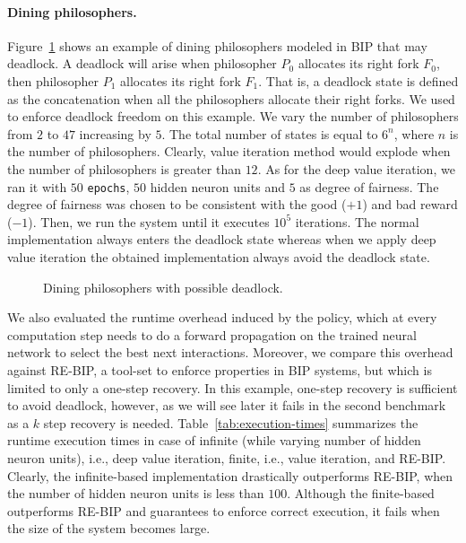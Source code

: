 \paragraph{Dining philosophers.} Figure~\ref{fig:diningbench} shows an example of dining philosophers modeled in BIP that may deadlock. A deadlock will arise when philosopher $P_0$ allocates its right fork $F_0$, then philosopher $P_1$ allocates its right fork $F_1$. That is, a deadlock state is defined as the concatenation when all the philosophers allocate their right forks. We used \rerl to enforce deadlock freedom on this example. We vary the number of philosophers from $2$ to $47$ increasing by $5$. The total number of states is equal to $6^{n}$, where $n$ is the number of philosophers. 
Clearly, value iteration method would explode when the number of philosophers is greater than $12$. 
%
As for the deep value iteration, we ran it with $50$ \texttt{epochs}, $50$ hidden neuron units and $5$ as degree of fairness. The degree of fairness was chosen to be consistent with the good ($+1$) and bad reward ($-1$). Then, we run the system until it executes $10^5$ iterations. The normal implementation always enters the deadlock state whereas when we apply deep value iteration the obtained implementation always avoid the deadlock state.  
%
\begin{figure}[t]
\centering
{}
\vspace*{-0.5cm}
\caption{Dining philosophers with possible deadlock.}
\vspace*{-0.3cm}
\label{fig:diningbench}
\end{figure}
%
We also evaluated the runtime overhead induced by the policy, which at every computation step needs to do a forward propagation on the trained neural network to select the best next interactions. Moreover, we compare this overhead against RE-BIP, a tool-set to enforce properties in BIP systems, but which is limited to only a one-step recovery. In this example, one-step recovery is sufficient to avoid deadlock, however, as we will see later it fails in the second benchmark as a $k$ step recovery is needed. Table~\ref{tab:execution-times} summarizes the runtime execution times in case of infinite (while varying number of hidden neuron units), i.e., deep value iteration, finite, i.e., value iteration, and RE-BIP. Clearly, the infinite-based implementation drastically outperforms RE-BIP, when the number of hidden neuron units is less than $100$. Although the finite-based outperforms RE-BIP and guarantees to enforce correct execution, it fails when the size of the system becomes large.  
